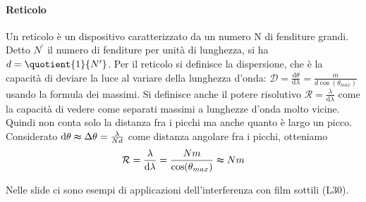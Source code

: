 \paragraph{Reticolo}
Un reticolo è un dispositivo caratterizzato da un numero N di fenditure grandi. Detto \(N^{\prime} \) il numero di fenditure per unità di lunghezza, si ha \(d= \quotient{1}{N^{\prime} } \). Per il reticolo si definisce la dispersione, che è la capacità di deviare la luce al variare della lunghezza d'onda: \(\mathcal{D} = \frac{\mathrm{d}\theta }{\mathrm{d} \lambda } = \frac{m}{d \cos (\theta_{max})} \) usando la formula dei massimi. Si definisce anche il potere risolutivo \(\mathcal{R} =\frac{\lambda }{\mathrm{d}\lambda } \) come la capacità di vedere come separati massimi a lunghezze d'onda molto vicine. Quindi non conta solo la distanza fra i picchi ma anche quanto è largo un picco. Considerato \(\mathrm{d} \theta \thickapprox \Delta \theta = \frac{\lambda }{N d}\) come distanza angolare fra i picchi, otteniamo
\begin{equation}
	\mathcal{R} = \frac{\lambda }{\mathrm{d} \lambda } = \frac{Nm}{\cos (\theta_{max})} \thickapprox Nm
\end{equation}

\begin{note}
	Nelle slide ci sono esempi di applicazioni dell'interferenza con film sottili (L30).
\end{note}